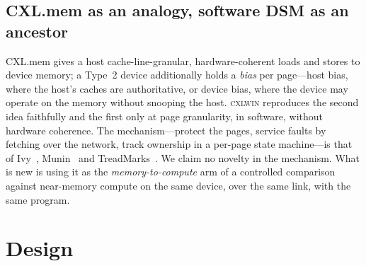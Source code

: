 \documentclass[lettersize,journal]{IEEEtran}
\newcommand{\cxlwin}{\textsc{cxlwin}}
\begin{document}
\subsection{CXL.mem as an analogy, software DSM as an ancestor}
CXL.mem gives a host cache-line-granular, hardware-coherent loads and stores to device memory; a Type~2 device additionally holds a \emph{bias} per page---host bias, where the host's caches are authoritative, or device bias, where the device may operate on the memory without snooping the host. \cxlwin{} reproduces the second idea faithfully and the first only at page granularity, in software, without hardware coherence. The mechanism---protect the pages, service faults by fetching over the network, track ownership in a per-page state machine---is that of Ivy~\cite{ivy}, Munin~\cite{munin} and TreadMarks~\cite{treadmarks}. We claim no novelty in the mechanism. What is new is using it as the \emph{memory-to-compute} arm of a controlled comparison against near-memory compute on the same device, over the same link, with the same program.

\section{Design}
\label{sec:design}
\end{document}
